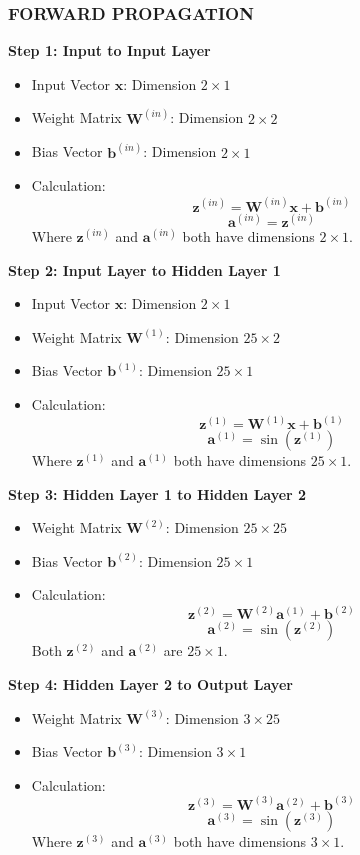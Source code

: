 \documentclass{ioereport}
\begin{document}
\subsubsection*{\MakeUppercase{Forward Propagation}}
\textbf{Step 1: Input to Input Layer}
\begin{itemize}
  \item Input Vector $\mathbf{x}$: Dimension $2 \times 1$
  \item Weight Matrix $\mathbf{W}^{(in)}$: Dimension $2 \times 2$
  \item Bias Vector $\mathbf{b}^{(in)}$: Dimension $2 \times 1$
  \item Calculation:
  \[
  \mathbf{z}^{(in)} = \mathbf{W}^{(in)} \mathbf{x} + \mathbf{b}^{(in)}
  \]
  \[
  \mathbf{a}^{(in)} = \mathbf{z}^{(in)}
  \]
  Where $\mathbf{z}^{(in)}$ and $\mathbf{a}^{(in)}$ both have dimensions $2 \times 1$.
\end{itemize}


\textbf{Step 2: Input Layer to Hidden Layer 1}
\begin{itemize}
  \item Input Vector $\mathbf{x}$: Dimension $2 \times 1$
  \item Weight Matrix $\mathbf{W}^{(1)}$: Dimension $25 \times 2$
  \item Bias Vector $\mathbf{b}^{(1)}$: Dimension $25 \times 1$
  \item Calculation:
  \[
  \mathbf{z}^{(1)} = \mathbf{W}^{(1)} \mathbf{x} + \mathbf{b}^{(1)}
  \]
  \[
  \mathbf{a}^{(1)} = \sin(\mathbf{z}^{(1)})
  \]
  Where $\mathbf{z}^{(1)}$ and $\mathbf{a}^{(1)}$ both have dimensions $25 \times 1$.
\end{itemize}

\textbf{Step 3: Hidden Layer 1 to Hidden Layer 2}
\begin{itemize}
  \item Weight Matrix $\mathbf{W}^{(2)}$: Dimension $25 \times 25$
  \item Bias Vector $\mathbf{b}^{(2)}$: Dimension $25 \times 1$
  \item Calculation:
  \[
  \mathbf{z}^{(2)} = \mathbf{W}^{(2)} \mathbf{a}^{(1)} + \mathbf{b}^{(2)}
  \]
  \[
  \mathbf{a}^{(2)} = \sin(\mathbf{z}^{(2)})
  \]
  Both $\mathbf{z}^{(2)}$ and $\mathbf{a}^{(2)}$ are $25 \times 1$.
\end{itemize}

\textbf{Step 4: Hidden Layer 2 to Output Layer}
\begin{itemize}
  \item Weight Matrix $\mathbf{W}^{(3)}$: Dimension $3 \times 25$
  \item Bias Vector $\mathbf{b}^{(3)}$: Dimension $3 \times 1$
  \item Calculation:
  \[
  \mathbf{z}^{(3)} = \mathbf{W}^{(3)} \mathbf{a}^{(2)} + \mathbf{b}^{(3)}
  \]
  \[
  \mathbf{a}^{(3)} = \sin(\mathbf{z}^{(3)})
  \]
  Where $\mathbf{z}^{(3)}$ and $\mathbf{a}^{(3)}$ both have dimensions $3 \times 1$.
\end{itemize}
\end{document}
